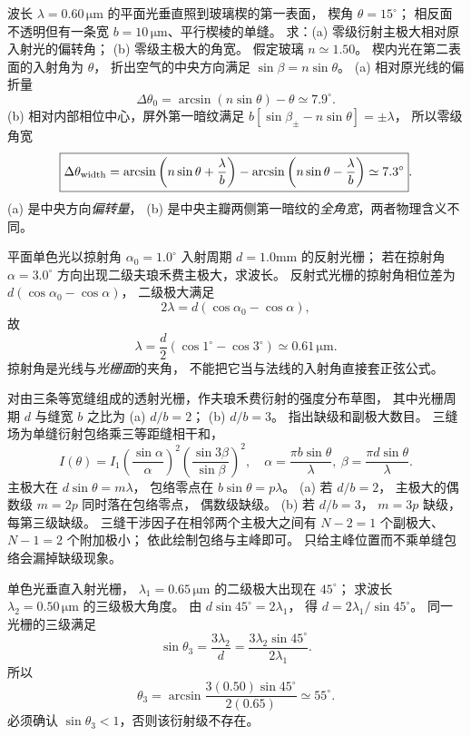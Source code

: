 波长 $\lambda=0.60\,\mathrm{\mu m}$ 的平面光垂直照到玻璃楔的第一表面，
楔角 $\theta=15^\circ$；
相反面不透明但有一条宽
$b=10\,\mathrm{\mu m}$、平行楔棱的单缝。
求：(a) 零级衍射主极大相对原入射光的偏转角；
(b) 零级主极大的角宽。
\exsolution
假定玻璃 $n\simeq1.50$。
楔内光在第二表面的入射角为 $\theta$，
折出空气的中央方向满足
$\sin\beta=n\sin\theta$。
(a) 相对原光线的偏折量
\[
\boxed{\Delta\theta_0=\arcsin(n\sin\theta)-\theta
\simeq7.9^\circ}.
\]
(b) 相对内部相位中心，屏外第一暗纹满足
$b[\sin\beta_\pm-n\sin\theta]=\pm\lambda$，
所以零级角宽
\[
\boxed{\Delta\theta_{\rm width}=
\arcsin\left(n\sin\theta+\frac{\lambda}{b}\right)
-\arcsin\left(n\sin\theta-\frac{\lambda}{b}\right)
\simeq7.3^\circ}.
\]
\excheck (a) 是中央方向\emph{偏转量}，
(b) 是中央主瓣两侧第一暗纹的\emph{全角宽}，两者物理含义不同。

平面单色光以掠射角
$\alpha_0=1.0^\circ$ 入射周期
$d=1.0$mm 的反射光栅；
若在掠射角 $\alpha=3.0^\circ$ 方向出现二级夫琅禾费主极大，求波长。
\exsolution
反射式光栅的掠射角相位差为
$d(\cos\alpha_0-\cos\alpha)$，
二级极大满足
\[
2\lambda=d(\cos\alpha_0-\cos\alpha),
\]
故
\[
\boxed{\lambda=
\frac d2(\cos1^\circ-\cos3^\circ)
\simeq0.61\,\mathrm{\mu m}}.
\]
\excheck 掠射角是光线与\emph{光栅面}的夹角，
不能把它当与法线的入射角直接套正弦公式。

对由三条等宽缝组成的透射光栅，作夫琅禾费衍射的强度分布草图，
其中光栅周期 $d$ 与缝宽 $b$ 之比为
(a) $d/b=2$；
(b) $d/b=3$。
指出缺级和副极大数目。
\exsolution
三缝场为单缝衍射包络乘三等距缝相干和，
\[
\boxed{I(\theta)=I_1
\left(\frac{\sin\alpha}{\alpha}\right)^2
\left(\frac{\sin3\beta}{\sin\beta}\right)^2},
\quad
\alpha=\frac{\pi b\sin\theta}{\lambda},\
\beta=\frac{\pi d\sin\theta}{\lambda}.
\]
主极大在 $d\sin\theta=m\lambda$，
包络零点在 $b\sin\theta=p\lambda$。
(a) 若 $d/b=2$，
主极大的偶数级 $m=2p$ 同时落在包络零点，
$\boxed{\text{偶数级缺级}}$。
(b) 若 $d/b=3$，
$m=3p$ 缺级，
$\boxed{\text{每第三级缺级}}$。
三缝干涉因子在相邻两个主极大之间有
$N-2=1$ 个副极大、$N-1=2$ 个附加极小；
依此绘制包络与主峰即可。
\excheck 只给主峰位置而不乘单缝包络会漏掉缺级现象。

单色光垂直入射光栅，
$\lambda_1=0.65\,\mathrm{\mu m}$ 的二级极大出现在
$45^\circ$；
求波长
$\lambda_2=0.50\,\mathrm{\mu m}$ 的三级极大角度。
\exsolution
由
$d\sin45^\circ=2\lambda_1$，
得
$d=2\lambda_1/\sin45^\circ$。
同一光栅的三级满足
\[
\sin\theta_3=\frac{3\lambda_2}{d}
=\frac{3\lambda_2\sin45^\circ}{2\lambda_1}.
\]
所以
\[
\boxed{\theta_3=
\arcsin\frac{3(0.50)\sin45^\circ}{2(0.65)}
\simeq55^\circ}.
\]
\excheck 必须确认 $\sin\theta_3<1$，否则该衍射级不存在。

